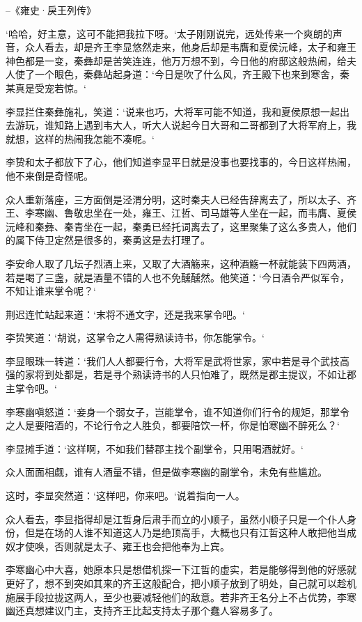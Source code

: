 --《雍史·戾王列传》

‘哈哈，好主意，这可不能把我拉下呀。‘太子刚刚说完，远处传来一个爽朗的声音，众人看去，却是齐王李显悠然走来，他身后却是韦膺和夏侯沅峰，太子和雍王神色都是一变，秦彝却是苦笑连连，他万万想不到，今日他的府邸这般热闹，给夫人使了一个眼色，秦彝站起身道：‘今日是吹了什么风，齐王殿下也来到寒舍，秦某真是受宠若惊。‘

李显拦住秦彝施礼，笑道：‘说来也巧，大将军可能不知道，我和夏侯原想一起出去游玩，谁知路上遇到韦大人，听大人说起今日大哥和二哥都到了大将军府上，我就想，这样的热闹我怎能不凑呢。‘

李贽和太子都放下了心，他们知道李显平日就是没事也要找事的，今日这样热闹，他不来倒是奇怪呢。

众人重新落座，三方面倒是泾渭分明，这时秦夫人已经告辞离去了，所以太子、齐王、李寒幽、鲁敬忠坐在一处，雍王、江哲、司马雄等人坐在一起，而韦膺、夏侯沅峰和秦彝、秦青坐在一起，秦勇已经托词离去了，这里聚集了这么多贵人，他们的属下侍卫定然是很多的，秦勇这是去打理了。

李安命人取了几坛子烈酒上来，又取了大酒觞来，这种酒觞一杯就能装下四两酒，若是喝了三盏，就是酒量不错的人也不免醺醺然。他笑道：‘今日酒令严似军令，不知让谁来掌令呢？‘

荆迟连忙站起来道：‘末将不通文字，还是我来掌令吧。‘

李贽笑道：‘胡说，这掌令之人需得熟读诗书，你怎能掌令。‘

李显眼珠一转道：‘我们人人都要行令，大将军是武将世家，家中若是寻个武技高强的家将到处都是，若是寻个熟读诗书的人只怕难了，既然是郡主提议，不如让郡主掌令吧。‘

李寒幽嗔怒道：‘妾身一个弱女子，岂能掌令，谁不知道你们行令的规矩，那掌令之人是要陪酒的，不论行令之人胜负，都要陪饮一杯，你是怕寒幽不醉死么？‘

李显摊手道：‘这样啊，不如我们替郡主找个副掌令，只用喝酒就好。‘

众人面面相觑，谁有人酒量不错，但是做李寒幽的副掌令，未免有些尴尬。

这时，李显突然道：‘这样吧，你来吧。‘说着指向一人。

众人看去，李显指得却是江哲身后肃手而立的小顺子，虽然小顺子只是一个仆人身份，但是在场的人谁不知道这人乃是绝顶高手，大概也只有江哲这种人敢把他当成奴才使唤，否则就是太子、雍王也会把他奉为上宾。

李寒幽心中大喜，她原本只是想借机探一下江哲的虚实，若是能够得到他的好感就更好了，想不到突如其来的齐王这般配合，把小顺子放到了明处，自己就可以趁机施展手段拉拢这两人，至少也要减轻他们的敌意。若非齐王名分上不占优势，李寒幽还真想建议门主，支持齐王比起支持太子那个蠢人容易多了。

